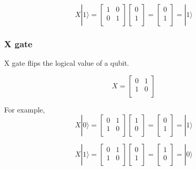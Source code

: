 $$ X|1\rangle = \begin{bmatrix}
1 & 0 \\
0 & 1 \\
\end{bmatrix} 
\left[
\begin{array}{c}
0 \\
1  \\
\end{array}
\right]
= \left[
\begin{array}{c}
0 \\
1 \\
\end{array}
\right]
= |1\rangle
$$


\subsubsection{X gate}

X gate flips the logical value of a qubit.

$$ X = \begin{bmatrix}
0 & 1 \\
1 & 0 \\
\end{bmatrix}
$$

For example,
$$ X|0\rangle = \begin{bmatrix}
0 & 1 \\
1 & 0 \\
\end{bmatrix} 
\left[
\begin{array}{c}
1 \\
0 \\
\end{array}
\right]
= \left[
\begin{array}{c}
0 \\
1 \\
\end{array}
\right]
= |1\rangle
$$

$$ X|1\rangle = \begin{bmatrix}
0 & 1 \\
1 & 0 \\
\end{bmatrix} 
\left[
\begin{array}{c}
0 \\
1  \\
\end{array}
\right]
= \left[
\begin{array}{c}
1 \\
0 \\
\end{array}
\right]
= |0\rangle
$$

